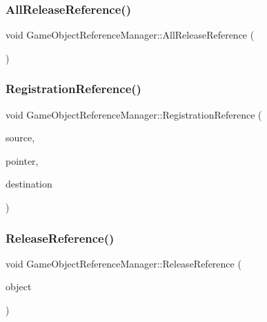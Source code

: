 \subsubsection{\texorpdfstring{All\+Release\+Reference()}{AllReleaseReference()}}
{\footnotesize\ttfamily void Game\+Object\+Reference\+Manager\+::\+All\+Release\+Reference (\begin{DoxyParamCaption}{ }\end{DoxyParamCaption})}

\mbox{\label{class_game_object_reference_manager_a4195eafdda534044454b6d48efc7d03d}} 
\subsubsection{\texorpdfstring{Registration\+Reference()}{RegistrationReference()}}
{\footnotesize\ttfamily void Game\+Object\+Reference\+Manager\+::\+Registration\+Reference (\begin{DoxyParamCaption}\item[{\mbox{\hyperlink{class_game_object_base}{Game\+Object\+Base}} $\ast$}]{source,  }\item[{void $\ast$}]{pointer,  }\item[{\mbox{\hyperlink{class_game_object_base}{Game\+Object\+Base}} $\ast$}]{destination }\end{DoxyParamCaption})}

\mbox{\label{class_game_object_reference_manager_ac7d117427de3052f893228408a3de5d7}} 
\subsubsection{\texorpdfstring{Release\+Reference()}{ReleaseReference()}}
{\footnotesize\ttfamily void Game\+Object\+Reference\+Manager\+::\+Release\+Reference (\begin{DoxyParamCaption}\item[{\mbox{\hyperlink{class_game_object_base}{Game\+Object\+Base}} $\ast$}]{object }\end{DoxyParamCaption})}



